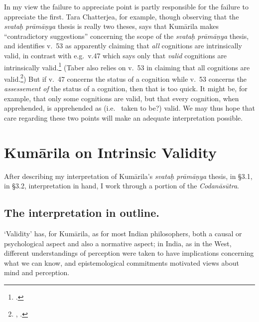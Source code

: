 ﻿\documentclass[11pt]{amsart}
\begin{document}
In my view the failure to appreciate point is partly responsible for the failure to appreciate the first. Tara Chatterjea, for example, though observing that the \emph{svata\d h pr\=am\=a\d nya} thesis is really two theses, says that Kum\=arila makes ``contradictory suggestions'' concerning the scope of the \emph{svata\d h pr\=am\=a\d nya} thesis, and identifies v.~53 as apparently claiming that \emph{all} cognitions are intrinsically valid, in contrast with e.g.~v.47 which says only that \emph{valid} cognitions are intrinsically valid.\footnote{\citet[p.~51]{chatterjea2003svatah}.} (Taber also relies on v.~53 in claiming that all cognitions are valid.\footnote{\citet[p.~171, n.~27]{taber2002mo}, \citet[p.~212]{taber1992dkb}.}) But if v.~47 concerns the status of a cognition while v.~53 concerns the \emph{assessement of} the status of a cognition, then that is too quick. It might be, for example, that only some cognitions are valid, but that every cognition, when apprehended, is apprehended as (i.e.~ taken to be?) valid. We may thus hope that care regarding these two points will make an adequate interpretation possible.






\section{Kum\=arila on Intrinsic Validity}



After describing my interpretation of Kum\=arila's \emph{svata\d h pr\=am\=a\d nya} thesis, in \S3.1, in \S3.2, interpretation in hand, I work through a portion of the \emph{Codan\=as\=utra}.


\subsection{The interpretation in outline.} \label{interpoutline}

`Validity' has, for Kum\=arila, as for most Indian philosophers, both a causal or psychological aspect and also a normative aspect; in India, as in the West, different understandings of perception were taken to have implications concerning what we can know, and epistemological commitments motivated views about mind and perception.
\end{document}
